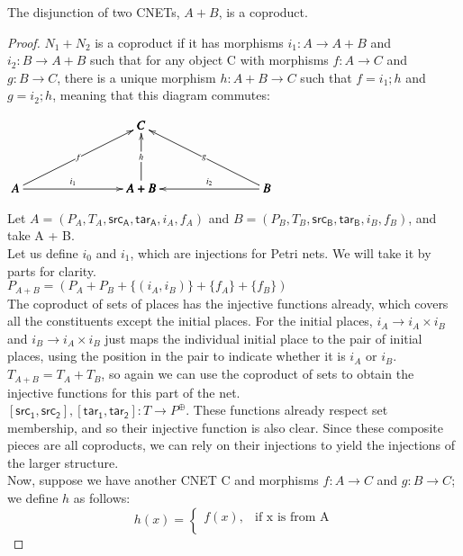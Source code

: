 \begin{lemma}
  \label{lemma:OR-coproduct}
  The disjunction of two CNETs, $A + B$, is a coproduct. 
\end{lemma}
\begin {proof}
$N_1 + N_2$ is a coproduct if it has morphisms $i_1: A \to A + B$ and $i_2: B \to A + B$ such that for any object C with morphisms $f: A\to C$ and $g: B\to C$, there is a unique morphism $h: A + B \to C$ such that $f = i_1;h$ and $g = i_2; h$, meaning that this diagram commutes:\\
\begin{center}
  \begin{math}
    \bfig
    \Atrianglepair|mmmaa|/<-`<-`<-`->`<-/<1000,500>[
      C`
      A`
      A+B`
      B;
      f`
      h`
      g`
      i_1`
      i_2]
    \efig
  \end{math}
\end{center}
Let $A = (P_A, T_A, \mathsf{src_A}, \mathsf{tar_A}, i_A, f_A)$ and $B = (P_B, T_B, \mathsf{src_B}, \mathsf{tar_B}, i_B, f_B)$, and take A + B.\\
Let us define $i_0$ and $i_1$, which are injections for Petri nets. We will take it by parts for clarity.\\
$P_{A+B} = (P_A +P_B+\{(i_A, i_B)\} +\{f_A\} + \{f_B\})$\\
The coproduct of sets of places has the injective functions already, which covers all the constituents except the initial places. For the initial places, $i_A \to i_A \times i_B$ and $i_B \to i_A \times i_B$ just maps the individual initial place to the pair of initial places, using the position in the pair to indicate whether it is $i_A$ or $i_B$.\\
$T_{A+B} = T_A + T_B$, so again we can use the coproduct of sets to obtain the injective functions for this part of the net.\\
 $[\mathsf{src_1}, \mathsf{src_2}], [\mathsf{tar_1}, \mathsf{tar_2}]: T\to P^\oplus$. These functions already respect set membership, and so their injective function is also clear. Since these composite pieces are all coproducts, we can rely on their injections to yield the injections of the larger structure.\smallskip\\ 
Now, suppose we have another CNET C and morphisms $f: A\to C$ and $g: B\to C$; we define $h$ as follows:\\
  \begin{equation}
    h(x)=
    \begin{cases}
      f(x), & \text{if x is from A}\\

\end{cases}
\end{equation}
\end{proof}
